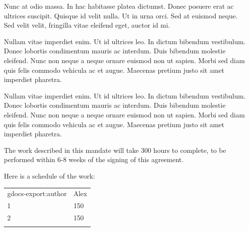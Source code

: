 {Nunc at odio massa. In hac habitasse platea dictumst. Donec posuere erat ac ultrices suscipit. Quisque id velit nulla. Ut in urna orci. Sed at euismod neque. Sed velit velit, fringilla vitae eleifend eget, auctor id mi.

Nullam vitae imperdiet enim. Ut id ultrices leo. In dictum bibendum vestibulum. Donec lobortis condimentum mauris ac interdum. Duis bibendum molestie eleifend. Nunc non neque a neque ornare euismod non ut sapien. Morbi sed diam quis felis commodo vehicula ac et augue. Maecenas pretium justo sit amet imperdiet pharetra.

Nullam vitae imperdiet enim. Ut id ultrices leo. In dictum bibendum vestibulum. Donec lobortis condimentum mauris ac interdum. Duis bibendum molestie eleifend. Nunc non neque a neque ornare euismod non ut sapien. Morbi sed diam quis felis commodo vehicula ac et augue. Maecenas pretium justo sit amet imperdiet pharetra.

\pagebreak


The work described in this mandate will take 300 hours to complete, to be performed within 6-8 weeks of the signing of this agreement.


Here is a schedule of the work:

\hyperref[]{}\hyperref[]{}

\begin{longtable}[c]{@{}ll@{}}
\toprule\addlinespace
\begin{minipage}[t]{0.47\columnwidth}\raggedright
gdocs-export:author
\end{minipage} & \begin{minipage}[t]{0.47\columnwidth}\raggedright
Alex
\end{minipage}
\\\addlinespace
\begin{minipage}[t]{0.47\columnwidth}\raggedright
1
\end{minipage} & \begin{minipage}[t]{0.47\columnwidth}\raggedright
150
\end{minipage}
\\\addlinespace
\begin{minipage}[t]{0.47\columnwidth}\raggedright
2
\end{minipage} & \begin{minipage}[t]{0.47\columnwidth}\raggedright
150
\end{minipage}
\\\addlinespace
\bottomrule
\end{longtable}

}
